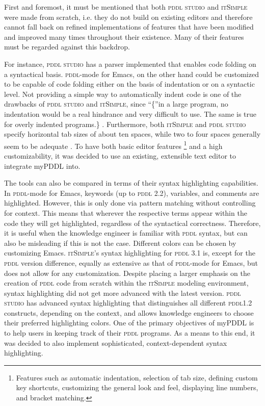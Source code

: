 \documentclass[a4paper,12pt]{report}
\newcommand{\mypddl}{\smallerft[0.8]{myPDDL}\xspace}
\newcommand{\pddlstudio}{\textsc{pddl studio}\xspace}
\newcommand{\itsimple}{\textsc{itSimple}\xspace}
\newcommand{\pddlmode}{\textsc{pddl}-mode\xspace}
\newcommand{\pddl}{\textsc{pddl}\xspace}
\newcommand\smallerft[2][0.85]{{\scalefont{#1}#2}}
\begin{document}
First and foremost, it must be mentioned that both \pddlstudio and
\itsimple were made from scratch, i.e. they do not build on existing
editors and therefore cannot fall back on refined implementations of
features that have been modified and improved many times throughout
their existence. Many of their features must be regarded against this
backdrop.

For instance, \pddlstudio has a parser implemented that enables code
folding on a syntactical basis. \pddl-mode for Emacs, on the other
hand could be customized to be capable of code folding either on the
basis of indentation or on a syntactic level. Not providing a simple
way to automatically indent code is one of the drawbacks of
\pddlstudio and \itsimple, since \enquote\{in a large program, no
indentation would be a real hindrance and very difficult to use. The
same is true for overly indented programs.\} \cite{miara1983program}.
Furthermore, both \itsimple and \pddlstudio specify horizontal tab
sizes of about ten spaces, while two to four spaces generally seem to
be adequate \cite{miara1983program}. To have both basic editor
features \footnote{Features such as automatic indentation, selection of tab size,
defining custom key shortcuts, customizing the general look and feel,
displaying line numbers, and bracket matching.} and a high customizability, it was decided to use an
existing, extensible text editor to integrate \mypddl into.

The tools can also be compared in terms of their syntax highlighting
capabilities. In \pddlmode for Emacs, keywords (up to \pddl 2.2),
variables, and comments are highlighted. However, this is only done
via pattern matching without controlling for context. This means that
wherever the respective terms appear within the code they will get
highlighted, regardless of the syntactical correctness. Therefore, it
is useful when the knowledge engineer is familiar with \pddl syntax,
but can also be misleading if this is not the case. Different colors
can be chosen by customizing Emacs. \itsimple's syntax highlighting
for \pddl 3.1 is, except for the \pddl version difference, equally as
extensive as that of \pddlmode for Emacs, but does not allow for any
customization. Despite placing a larger emphasis on the creation of
\pddl code from scratch within the \itsimple modeling environment,
syntax highlighting did not get more advanced with the latest version.
\pddlstudio has advanced syntax highlighting that distinguishes all
different \pddl \smallerft[0.8]{1.2} constructs, depending on the context, and allows
knowledge engineers to choose their preferred highlighting colors. One
of the primary objectives of \mypddl is to help users in keeping track
of their \pddl programs. As a means to this end, it was decided to
also implement sophisticated, context-dependent syntax highlighting.
\end{document}
